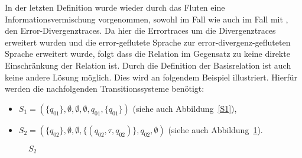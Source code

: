 In der letzten Definition wurde wieder durch das Fluten eine
Informationsvermischung vorgenommen, sowohl im Fall \QDT{} wie auch im Fall
\EDL{} mit \EDT{}, den Error-Divergenz\-traces. Da hier die Errortraces um die
Divergenztraces erweitert wurden und die error-geflutete Sprache zur
error-divergenz-gefluteten Sprache erweitert wurde, folgt dass die Relation
\DRel{} im Gegensatz zu \QRel{} keine direkte Einschränkung der Relation
\ERel{} ist. Durch die Definition der Basisrelation ist auch keine andere
Lösung möglich. Dies wird an folgendem Beispiel illustriert. Hierfür werden
die nachfolgenden Transitionssysteme benötigt:
\begin{itemize}
  \item $S_1 = \left(\{q_{01}\},\emptyset ,\emptyset , \emptyset, q_{01},
    \{q_{01}\}\right)$ (siehe auch Abbildung~\ref{S1}),
  \item $S_2 = \left(\{q_{02}\},\emptyset ,\emptyset , \{(q_{02},\tau ,q_{02})\},
    q_{02}, \emptyset \right)$ (siehe auch Abbildung~\ref{S2}).
\end{itemize}
\begin{figure}[h!tbp]
  \begin{minipage}{0.49\textwidth}
  \begin{center}
    \caption{$S_1$}
\label{S1}
  \end{center}
  \end{minipage}
  \hfill
  \begin{minipage}{0.49\textwidth}
  \begin{center}
    \caption{$S_2$}
\label{S2}
  \end{center}
  \end{minipage}
\end{figure}

